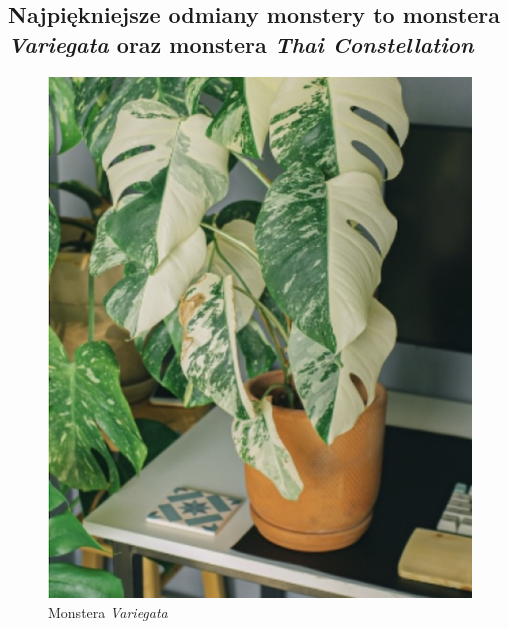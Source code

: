 \subsection{Najpiękniejsze odmiany monstery to monstera \emph{Variegata} oraz monstera \emph{Thai Constellation}}
\begin{figure}[hbt!]
    \begin{minipage}{0.5\textwidth}
        \centering
        \includegraphics[width=\linewidth]{pictures/monsteravariegata.jpeg}
        \caption{Monstera \emph{Variegata}}
    \end{minipage}%
    \begin{minipage}{0.5\textwidth}
        \centering

\end{minipage}
\end{figure}
